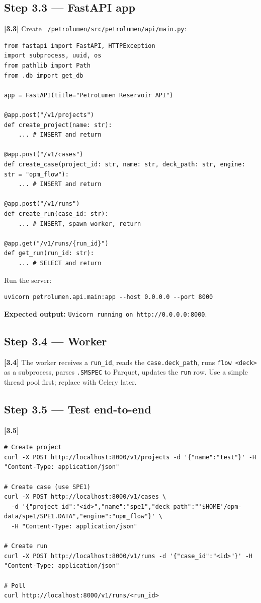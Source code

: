\documentclass[10pt,a4paper]{article}
\newcommand{\stepID}[1]{\textsf{\textbf{[#1]}}}
\newcommand{\cmd}[1]{\texttt{#1}}
\newcommand{\file}[1]{\texttt{#1}}
\begin{document}
\subsection{Step 3.3 --- FastAPI app}

\stepID{3.3} Create \file{~/petrolumen/src/petrolumen/api/main.py}:

\begin{lstlisting}
from fastapi import FastAPI, HTTPException
import subprocess, uuid, os
from pathlib import Path
from .db import get_db

app = FastAPI(title="PetroLumen Reservoir API")

@app.post("/v1/projects")
def create_project(name: str):
    ... # INSERT and return

@app.post("/v1/cases")
def create_case(project_id: str, name: str, deck_path: str, engine: str = "opm_flow"):
    ... # INSERT and return

@app.post("/v1/runs")
def create_run(case_id: str):
    ... # INSERT, spawn worker, return

@app.get("/v1/runs/{run_id}")
def get_run(run_id: str):
    ... # SELECT and return
\end{lstlisting}

Run the server:
\begin{lstlisting}[style=sh]
uvicorn petrolumen.api.main:app --host 0.0.0.0 --port 8000
\end{lstlisting}

\textbf{Expected output:} \cmd{Uvicorn running on http://0.0.0.0:8000}.

\subsection{Step 3.4 --- Worker}

\stepID{3.4} The worker receives a \cmd{run\_id}, reads the \cmd{case.deck\_path}, runs \cmd{flow <deck>} as a subprocess, parses \cmd{.SMSPEC} to Parquet, updates the \cmd{run} row. Use a simple thread pool first; replace with Celery later.

\subsection{Step 3.5 --- Test end-to-end}

\stepID{3.5}
\begin{lstlisting}[style=sh]
# Create project
curl -X POST http://localhost:8000/v1/projects -d '{"name":"test"}' -H "Content-Type: application/json"

# Create case (use SPE1)
curl -X POST http://localhost:8000/v1/cases \
  -d '{"project_id":"<id>","name":"spe1","deck_path":"'$HOME'/opm-data/spe1/SPE1.DATA","engine":"opm_flow"}' \
  -H "Content-Type: application/json"

# Create run
curl -X POST http://localhost:8000/v1/runs -d '{"case_id":"<id>"}' -H "Content-Type: application/json"

# Poll
curl http://localhost:8000/v1/runs/<run_id>
\end{lstlisting}
\end{document}
